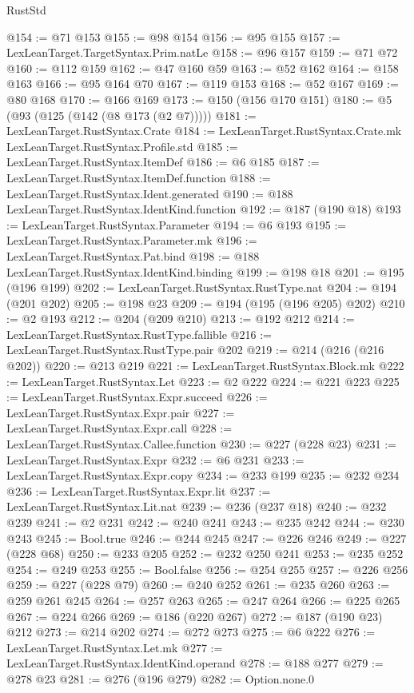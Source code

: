 \begin{lexlean}{RustStd}
\begin{coremodule}
@154 := @71 @153
@155 := @98 @154
@156 := @95 @155
@157 := LexLeanTarget.TargetSyntax.Prim.natLe
@158 := @96 @157
@159 := @71 @72
@160 := @112 @159
@162 := @47 @160 @59
@163 := @52 @162
@164 := @158 @163
@166 := @95 @164 @70
@167 := @119 @153
@168 := @52 @167
@169 := @80 @168
@170 := @166 @169
@173 := @150 (@156 @170 @151)
@180 := @5 (@93 (@125 (@142 (@8 @173 (@2 @7)))))
@181 := LexLeanTarget.RustSyntax.Crate
@184 := LexLeanTarget.RustSyntax.Crate.mk LexLeanTarget.RustSyntax.Profile.std
@185 := LexLeanTarget.RustSyntax.ItemDef
@186 := @6 @185
@187 := LexLeanTarget.RustSyntax.ItemDef.function
@188 := LexLeanTarget.RustSyntax.Ident.generated
@190 := @188 LexLeanTarget.RustSyntax.IdentKind.function
@192 := @187 (@190 @18)
@193 := LexLeanTarget.RustSyntax.Parameter
@194 := @6 @193
@195 := LexLeanTarget.RustSyntax.Parameter.mk
@196 := LexLeanTarget.RustSyntax.Pat.bind
@198 := @188 LexLeanTarget.RustSyntax.IdentKind.binding
@199 := @198 @18
@201 := @195 (@196 @199)
@202 := LexLeanTarget.RustSyntax.RustType.nat
@204 := @194 (@201 @202)
@205 := @198 @23
@209 := @194 (@195 (@196 @205) @202)
@210 := @2 @193
@212 := @204 (@209 @210)
@213 := @192 @212
@214 := LexLeanTarget.RustSyntax.RustType.fallible
@216 := LexLeanTarget.RustSyntax.RustType.pair @202
@219 := @214 (@216 (@216 @202))
@220 := @213 @219
@221 := LexLeanTarget.RustSyntax.Block.mk
@222 := LexLeanTarget.RustSyntax.Let
@223 := @2 @222
@224 := @221 @223
@225 := LexLeanTarget.RustSyntax.Expr.succeed
@226 := LexLeanTarget.RustSyntax.Expr.pair
@227 := LexLeanTarget.RustSyntax.Expr.call
@228 := LexLeanTarget.RustSyntax.Callee.function
@230 := @227 (@228 @23)
@231 := LexLeanTarget.RustSyntax.Expr
@232 := @6 @231
@233 := LexLeanTarget.RustSyntax.Expr.copy
@234 := @233 @199
@235 := @232 @234
@236 := LexLeanTarget.RustSyntax.Expr.lit
@237 := LexLeanTarget.RustSyntax.Lit.nat
@239 := @236 (@237 @18)
@240 := @232 @239
@241 := @2 @231
@242 := @240 @241
@243 := @235 @242
@244 := @230 @243
@245 := Bool.true
@246 := @244 @245
@247 := @226 @246
@249 := @227 (@228 @68)
@250 := @233 @205
@252 := @232 @250 @241
@253 := @235 @252
@254 := @249 @253
@255 := Bool.false
@256 := @254 @255
@257 := @226 @256
@259 := @227 (@228 @79)
@260 := @240 @252
@261 := @235 @260
@263 := @259 @261 @245
@264 := @257 @263
@265 := @247 @264
@266 := @225 @265
@267 := @224 @266
@269 := @186 (@220 @267)
@272 := @187 (@190 @23) @212
@273 := @214 @202
@274 := @272 @273
@275 := @6 @222
@276 := LexLeanTarget.RustSyntax.Let.mk
@277 := LexLeanTarget.RustSyntax.IdentKind.operand
@278 := @188 @277
@279 := @278 @23
@281 := @276 (@196 @279)
@282 := Option.none.{0}

\end{coremodule}
\end{lexlean}
